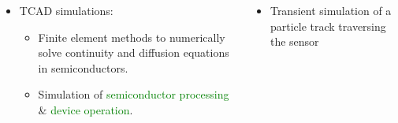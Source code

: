 \begin{frame}
  \vspace{-0.3cm}

  \begin{columns}[t]
    \begin{itemize}
    \item TCAD simulations:
      \begin{itemize}
      \item Finite element methods to numerically solve continuity and
        diffusion equations in semiconductors.
      \item Simulation of \textcolor{Green}{semiconductor processing}
        \& \textcolor{Green}{device operation}.
      \end{itemize}
    \end{itemize}

    \begin{itemize}
    \item Transient simulation of a particle track traversing the
      sensor
    \end{itemize}

    \centering
  \end{columns}

\end{frame}

